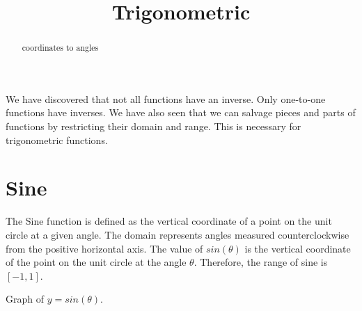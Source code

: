 \documentclass{ximera}
\title{Trigonometric}
\begin{document}
\begin{abstract}
coordinates to angles
\end{abstract}
\maketitle



We have discovered that not all functions have an inverse.  Only one-to-one functions have inverses.  We have also seen that we can salvage pieces and parts of functions by restricting their domain and range.  This is necessary for trigonometric functions.





\section{Sine}

The Sine function is defined as the vertical coordinate of a point on the unit circle at a given angle.  The domain represents angles measured counterclockwise from the positive horizontal axis. The value of $sin(\theta)$ is the vertical coordinate of the point on the unit circle at the angle $\theta$. Therefore, the range of sine is $[-1, 1]$.


Graph of $y = sin(\theta)$.

\begin{image}
\end{image}
\end{document}
